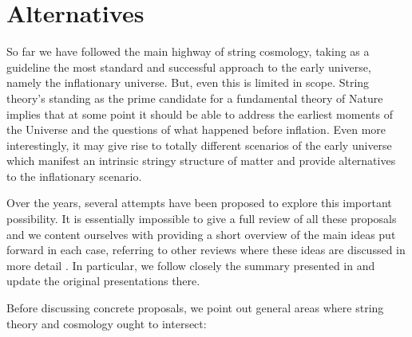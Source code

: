\startdocument


\section{Alternatives}
\label{sec:Alt}

So far we have followed the main highway of string cosmology, taking as a guideline the most standard and successful approach to the early universe, namely the inflationary universe. But, even this is limited in scope. String theory's standing as the prime candidate for a fundamental theory of Nature implies that
at some point it should be able to address the earliest moments of the Universe and the questions of what happened before inflation. 
Even more interestingly, it may give rise to totally different scenarios of the early universe which manifest an intrinsic stringy structure of matter and 
provide alternatives to the inflationary scenario. 

Over the years, several attempts have been proposed to explore this important possibility. It is essentially impossible to give a full review of 
all these proposals and we content ourselves with providing a short overview of the main ideas put forward in each case, 
referring to other reviews where these ideas are discussed in more detail \cite{Gasperini:2002bn,Lehners:2008vx,Brandenberger:2008nx,Battefeld:2005av,Brandenberger:2016vhg,McFadden:2009fg,Nastase:2019rsn}. 
In particular, we follow closely the summary presented in \cite{Quevedo:2002xw} and update the original presentations there.

Before discussing concrete proposals, we point out general areas where string theory and cosmology ought to intersect:


